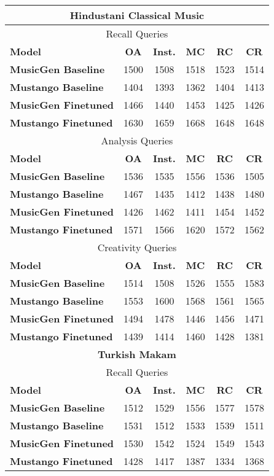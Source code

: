 \begin{table*}
{\begin{tabular}{lccccc}
\multicolumn{6}{c}{\textbf{Hindustani Classical Music}} \\ \midrule

\multicolumn{6}{c}{Recall Queries} \\ \midrule
\textbf{Model} & \textbf{OA} & \textbf{Inst.} & \textbf{MC} & \textbf{RC} & \textbf{CR} \\ \midrule
\textbf{MusicGen Baseline} & 1500 & 1508 & 1518 & 1523 & 1514 \\
\textbf{Mustango Baseline} & 1404 & 1393 & 1362 & 1404 & 1413 \\
\textbf{MusicGen Finetuned} & 1466 & 1440 & 1453 & 1425 & 1426 \\
\textbf{Mustango Finetuned} & 1630 & 1659 & 1668 & 1648 & 1648 \\ \midrule

\multicolumn{6}{c}{Analysis Queries} \\ \midrule
\textbf{Model} & \textbf{OA} & \textbf{Inst.} & \textbf{MC} & \textbf{RC} & \textbf{CR} \\ \midrule
\textbf{MusicGen Baseline} & 1536 & 1535 & 1556 & 1536 & 1505 \\
\textbf{Mustango Baseline} & 1467 & 1435 & 1412 & 1438 & 1480 \\
\textbf{MusicGen Finetuned} & 1426 & 1462 & 1411 & 1454 & 1452 \\
\textbf{Mustango Finetuned} & 1571 & 1566 & 1620 & 1572 & 1562 \\ \midrule

\multicolumn{6}{c}{Creativity Queries} \\ \midrule
\textbf{Model} & \textbf{OA} & \textbf{Inst.} & \textbf{MC} & \textbf{RC} & \textbf{CR} \\ \midrule
\textbf{MusicGen Baseline} & 1514 & 1508 & 1526 & 1555 & 1583 \\
\textbf{Mustango Baseline} & 1553 & 1600 & 1568 & 1561 & 1565 \\
\textbf{MusicGen Finetuned} & 1494 & 1478 & 1446 & 1456 & 1471 \\
\textbf{Mustango Finetuned} & 1439 & 1414 & 1460 & 1428 & 1381 \\ \midrule

\multicolumn{6}{c}{\textbf{Turkish Makam}} \\ \midrule

\multicolumn{6}{c}{Recall Queries} \\ \midrule
\textbf{Model} & \textbf{OA} & \textbf{Inst.} & \textbf{MC} & \textbf{RC} & \textbf{CR} \\ \midrule
\textbf{MusicGen Baseline} & 1512 & 1529 & 1556 & 1577 & 1578 \\
\textbf{Mustango Baseline} & 1531 & 1512 & 1533 & 1539 & 1511 \\
\textbf{MusicGen Finetuned} & 1530 & 1542 & 1524 & 1549 & 1543 \\
\textbf{Mustango Finetuned} & 1428 & 1417 & 1387 & 1334 & 1368 \\ \midrule


\end{tabular}}
\end{table*}
